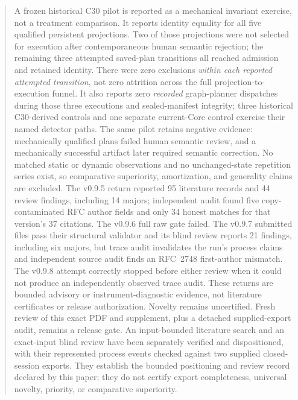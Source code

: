 \documentclass[11pt]{article}
\begin{document}
\begin{abstract}
A frozen historical C30 pilot is reported as a mechanical invariant exercise,
not a treatment comparison. It reports identity equality for all five qualified
persistent projections. Two of those projections were not selected for
execution after contemporaneous human semantic rejection; the remaining three
attempted saved-plan transitions all reached admission and retained identity.
There were zero exclusions \emph{within each reported attempted transition},
not zero attrition across the full projection-to-execution funnel. It also reports zero
\emph{recorded} graph-planner dispatches during those three executions and
sealed-manifest integrity;
three historical C30-derived controls and one separate current-Core control
exercise their named detector paths.
The same pilot retains negative evidence: mechanically qualified plans failed
human semantic review, and a mechanically successful artifact later required
semantic correction.  No matched static or dynamic observations and no
unchanged-state repetition series exist, so comparative superiority,
amortization, and generality claims are excluded.
\ifdefined\InternalBuild
  The v0.9.5 return reported 95 literature records and 44 review findings,
  including 14 majors; independent audit found five copy-contaminated RFC
  author fields and only 34 honest matches for that version's 37 citations.
  The v0.9.6 full raw gate failed. The v0.9.7 submitted files pass their
  structural validator and its blind review reports 21 findings, including six
  majors, but trace audit invalidates the run's process claims and independent
  source audit finds an RFC~2748 first-author mismatch. The v0.9.8 attempt
  correctly stopped before either review when it could not produce an
  independently observed trace audit. These returns are bounded advisory or
  instrument-diagnostic evidence, not literature certificates or release
  authorization. Novelty remains uncertified. Fresh review of this exact PDF
  and supplement, plus a detached supplied-export audit, remains a release
  gate.
\else
  \ifdefined\VerifiedLiterature
    An input-bounded literature search and an exact-input blind review have
    been separately verified and dispositioned, with their represented process
    events checked against two supplied closed-session exports. They establish
    the bounded positioning and review record declared by this paper; they do
    not certify export completeness, universal novelty, priority, or
    comparative superiority.
  \else
    \PackageError{agent-graph-runtime}{Missing publication mode}{%
      Build with build.py in internal or release mode.%
    }%
  \fi
\fi
\end{abstract}
\end{document}
